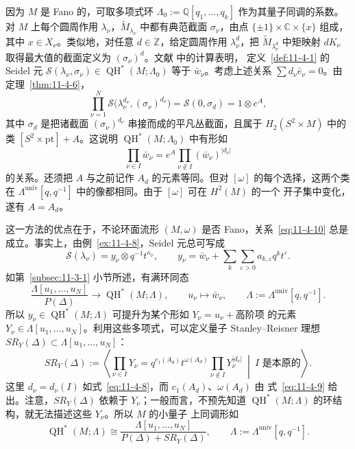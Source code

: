 \begin{remark}\label{rem:11-4-10}
因为 $M$ 是 Fano 的，可取多项式环
$\Lambda_0:=\mathbb Q[q_1,\ldots,q_k]$ 作为其量子同调的系数。对 $M$ 上每个圆周作用
$\lambda_\nu$，$\widetilde M_{\lambda_\nu}$ 中都有典范截面 $\sigma_\nu$，由点
$\{\pm1\}\times\mathbb C\times\{x\}$ 组成，其中 $x\in X_\nu$。类似地，对任意
$d\in\mathbb Z$，给定圆周作用 $\lambda_\nu^d$，把 $\widetilde M_{\lambda_\nu^d}$ 中矩映射
$dK_\nu$ 取得最大值的截面定义为 $(\sigma_\nu)^d$。文献  中的计算表明，
定义~\ref{def:11-4-1} 的 Seidel 元
$\mathcal S(\lambda_\nu,\sigma_\nu)\in\operatorname{QH}^*(M;\Lambda_0)$ 等于
$\bar w_\nu$。考虑上述关系 $\sum d_\nu\bar e_\nu=0$。由
定理~\ref{thm:11-4-6}，
\[
  \prod_{\nu=1}^N
  \mathcal S\bigl(\lambda_\nu^{d_\nu},(\sigma_\nu)^{d_\nu}\bigr)
  =\mathcal S(0,\sigma_d)=1\otimes e^A,
\]
其中 $\sigma_d$ 是把诸截面 $(\sigma_\nu)^{d_\nu}$ 串接而成的平凡丛截面，且属于
$H_2(S^2\times M)$ 中的类 $[S^2\times\mathrm{pt}]+A$。这说明
$\operatorname{QH}^*(M;\Lambda_0)$ 中有形如
\[
  \prod_{\nu\in I}\bar w_\nu
  =e^A\prod_{\nu\notin I}(\bar w_\nu)^{|d_\nu|}
\]
的关系。还须把 $A$ 与之前记作 $A_d$ 的元素等同。但对 $[\omega]$ 的每个选择，这两个类
在 $\Lambda^{\mathrm{univ}}[q,q^{-1}]$ 中的像都相同。由于 $[\omega]$ 可在 $H^2(M)$ 的一个
开子集中变化，遂有 $A=A_d$。

这一方法的优点在于，不论环面流形 $(M,\omega)$ 是否 Fano，关系~\eqref{eq:11-4-10}
总是成立。事实上，由例~\ref{ex:11-4-8}，Seidel 元总可写成
\[
  \mathcal S(\lambda_\nu)=y_\nu\otimes q^{-1}t^{\kappa_\nu},
  \qquad
  y_\nu=\bar w_\nu+\sum_k\sum_{\varepsilon>0}a_{k,\varepsilon}q^kt^\varepsilon.
\]
如第~\ref{subsec:11-3-1} 小节所述，有满环同态
\[
  \frac{\Lambda[u_1,\ldots,u_N]}{P(\Delta)}
  \longrightarrow\operatorname{QH}^*(M;\Lambda),
  \qquad
  u_\nu\longmapsto\bar w_\nu,
  \qquad
  \Lambda:=\Lambda^{\mathrm{univ}}[q,q^{-1}].
\]
所以 $y_\nu\in\operatorname{QH}^*(M;\Lambda)$ 可提升为某个形如
$Y_\nu=u_\nu+\text{高阶项}$ 的元素
$Y_\nu\in\Lambda[u_1,\ldots,u_N]$。利用这些多项式，可以定义量子
Stanley--Reisner 理想 $SR_Y(\Delta)\subset\Lambda[u_1,\ldots,u_N]$：
\begin{equation}\label{eq:11-4-11}
  SR_Y(\Delta):=
  \left\langle
  \prod_{\nu\in I}Y_\nu
  =q^{c_1(A_d)}t^{\omega(A_d)}
   \prod_{\nu\notin I}Y_\nu^{|d_\nu|}
  \ \middle|\ I\text{ 是本原的}
  \right\rangle.
\end{equation}
这里 $d_\nu=d_\nu(I)$ 如式~\eqref{eq:11-4-8}，而 $c_1(A_d)$、$\omega(A_d)$ 由
式~\eqref{eq:11-4-9} 给出。注意，$SR_Y(\Delta)$ 依赖于 $Y_\nu$；一般而言，不预先知道
$\operatorname{QH}^*(M;\Lambda)$ 的环结构，就无法描述这些 $Y_\nu$。所以 $M$ 的小量子
上同调形如
\[
  \operatorname{QH}^*(M;\Lambda)
  \cong\frac{\Lambda[u_1,\ldots,u_N]}{P(\Delta)+SR_Y(\Delta)},
  \qquad
  \Lambda:=\Lambda^{\mathrm{univ}}[q,q^{-1}].
\]
\end{remark}

